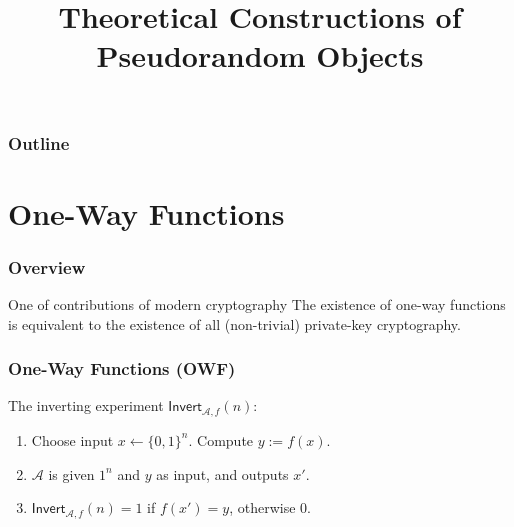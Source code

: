 

\title{Theoretical Constructions of Pseudorandom Objects}


\maketitle
\begin{frame}
\frametitle{Outline}
\tableofcontents
\end{frame}
\section{One-Way Functions}
\begin{frame}\frametitle{Overview}
\begin{figure}
\begin{center}

\end{center}
\end{figure}
\begin{alertblock}{One of contributions of modern cryptography}
The existence of one-way functions is equivalent to the existence of all (non-trivial) private-key cryptography.
\end{alertblock}
\end{frame}
\begin{frame}\frametitle{One-Way Functions (OWF)}
\begin{figure}
\begin{center}

\end{center}
\end{figure}
The inverting experiment $\mathsf{Invert}_{\mathcal{A},f}(n)$:
\begin{enumerate}
\item Choose input $x \gets \{0,1\}^n$. Compute $y := f(x)$.
\item $\mathcal{A}$ is given $1^n$ and $y$ as input, and outputs $x'$.
\item $\mathsf{Invert}_{\mathcal{A},f}(n) = 1$ if $f(x')=y$, otherwise 0.
\end{enumerate}

\end{frame}

